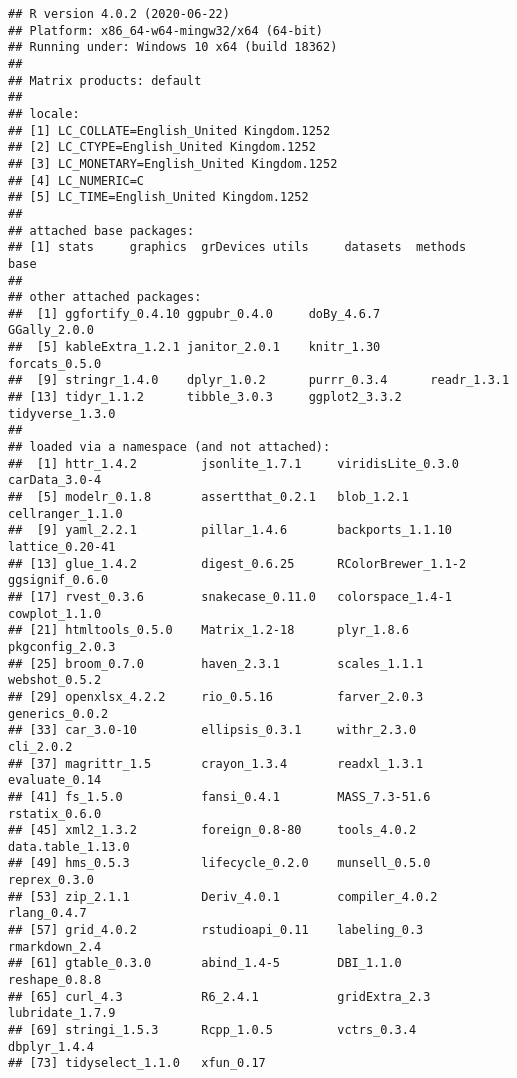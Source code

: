 \documentclass[
]{article}
\begin{document}
\begin{verbatim}
## R version 4.0.2 (2020-06-22)
## Platform: x86_64-w64-mingw32/x64 (64-bit)
## Running under: Windows 10 x64 (build 18362)
## 
## Matrix products: default
## 
## locale:
## [1] LC_COLLATE=English_United Kingdom.1252 
## [2] LC_CTYPE=English_United Kingdom.1252   
## [3] LC_MONETARY=English_United Kingdom.1252
## [4] LC_NUMERIC=C                           
## [5] LC_TIME=English_United Kingdom.1252    
## 
## attached base packages:
## [1] stats     graphics  grDevices utils     datasets  methods   base     
## 
## other attached packages:
##  [1] ggfortify_0.4.10 ggpubr_0.4.0     doBy_4.6.7       GGally_2.0.0    
##  [5] kableExtra_1.2.1 janitor_2.0.1    knitr_1.30       forcats_0.5.0   
##  [9] stringr_1.4.0    dplyr_1.0.2      purrr_0.3.4      readr_1.3.1     
## [13] tidyr_1.1.2      tibble_3.0.3     ggplot2_3.3.2    tidyverse_1.3.0 
## 
## loaded via a namespace (and not attached):
##  [1] httr_1.4.2         jsonlite_1.7.1     viridisLite_0.3.0  carData_3.0-4     
##  [5] modelr_0.1.8       assertthat_0.2.1   blob_1.2.1         cellranger_1.1.0  
##  [9] yaml_2.2.1         pillar_1.4.6       backports_1.1.10   lattice_0.20-41   
## [13] glue_1.4.2         digest_0.6.25      RColorBrewer_1.1-2 ggsignif_0.6.0    
## [17] rvest_0.3.6        snakecase_0.11.0   colorspace_1.4-1   cowplot_1.1.0     
## [21] htmltools_0.5.0    Matrix_1.2-18      plyr_1.8.6         pkgconfig_2.0.3   
## [25] broom_0.7.0        haven_2.3.1        scales_1.1.1       webshot_0.5.2     
## [29] openxlsx_4.2.2     rio_0.5.16         farver_2.0.3       generics_0.0.2    
## [33] car_3.0-10         ellipsis_0.3.1     withr_2.3.0        cli_2.0.2         
## [37] magrittr_1.5       crayon_1.3.4       readxl_1.3.1       evaluate_0.14     
## [41] fs_1.5.0           fansi_0.4.1        MASS_7.3-51.6      rstatix_0.6.0     
## [45] xml2_1.3.2         foreign_0.8-80     tools_4.0.2        data.table_1.13.0 
## [49] hms_0.5.3          lifecycle_0.2.0    munsell_0.5.0      reprex_0.3.0      
## [53] zip_2.1.1          Deriv_4.0.1        compiler_4.0.2     rlang_0.4.7       
## [57] grid_4.0.2         rstudioapi_0.11    labeling_0.3       rmarkdown_2.4     
## [61] gtable_0.3.0       abind_1.4-5        DBI_1.1.0          reshape_0.8.8     
## [65] curl_4.3           R6_2.4.1           gridExtra_2.3      lubridate_1.7.9   
## [69] stringi_1.5.3      Rcpp_1.0.5         vctrs_0.3.4        dbplyr_1.4.4      
## [73] tidyselect_1.1.0   xfun_0.17
\end{verbatim}
\end{document}
